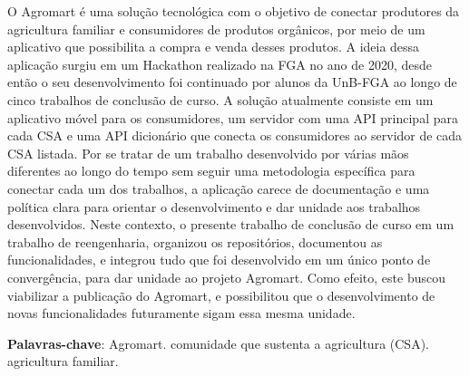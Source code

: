 \begin{resumo}
O Agromart é uma solução tecnológica com o objetivo de conectar produtores da agricultura familiar e consumidores de produtos orgânicos, por meio de um aplicativo que possibilita a compra e venda desses produtos. A ideia dessa aplicação surgiu em um Hackathon realizado na FGA no ano de 2020, desde então o seu desenvolvimento foi continuado por alunos da UnB-FGA ao longo de cinco trabalhos de conclusão de curso. A solução atualmente consiste em um aplicativo móvel para os consumidores, um servidor com uma API principal para cada CSA e uma API dicionário que conecta os consumidores ao servidor de cada CSA listada. Por se tratar de um trabalho desenvolvido por várias mãos diferentes ao longo do tempo sem seguir uma metodologia específica para conectar cada um dos trabalhos, a aplicação carece de documentação e uma política clara para orientar o desenvolvimento e dar unidade aos trabalhos desenvolvidos. Neste contexto, o presente trabalho de conclusão de curso em um trabalho de reengenharia, organizou os repositórios, documentou as funcionalidades, e integrou tudo que foi desenvolvido em um único ponto de convergência, para dar unidade ao projeto Agromart. Como efeito, este buscou viabilizar a publicação do Agromart, e possibilitou que o desenvolvimento de novas funcionalidades futuramente sigam essa mesma unidade.

 \vspace{\onelineskip}
    
 \noindent
 \textbf{Palavras-chave}: Agromart. comunidade que sustenta a agricultura (CSA). agricultura familiar.
\end{resumo}
